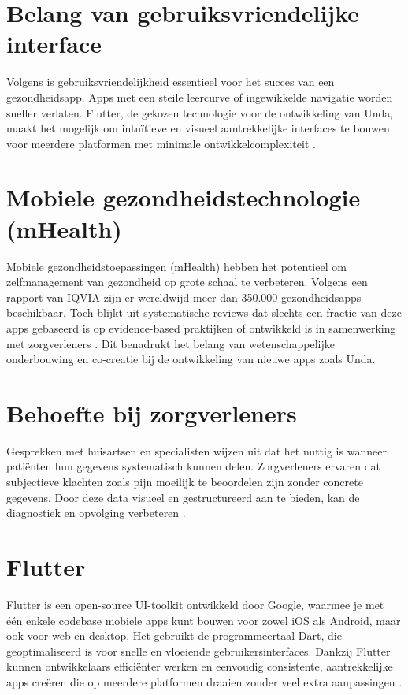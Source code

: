 \section{Belang van gebruiksvriendelijke interface}
Volgens \textcite{Zhao2016} is gebruiksvriendelijkheid essentieel voor het succes van een gezondheidsapp. Apps met een steile leercurve of ingewikkelde navigatie worden sneller verlaten. Flutter, de gekozen technologie voor de ontwikkeling van Unda, maakt het mogelijk om intuïtieve en visueel aantrekkelijke interfaces te bouwen voor meerdere platformen met minimale ontwikkelcomplexiteit \autocite{FlutterDocs2023}.

\section{Mobiele gezondheidstechnologie (mHealth)}
Mobiele gezondheidstoepassingen (mHealth) hebben het potentieel om zelfmanagement van gezondheid op grote schaal te verbeteren. Volgens een rapport van IQVIA zijn er wereldwijd meer dan 350.000 gezondheidsapps beschikbaar. Toch blijkt uit systematische reviews dat slechts een fractie van deze apps gebaseerd is op evidence-based praktijken of ontwikkeld is in samenwerking met zorgverleners \autocite{Byambasuren2018}. Dit benadrukt het belang van wetenschappelijke onderbouwing en co-creatie bij de ontwikkeling van nieuwe apps zoals Unda.

\section{Behoefte bij zorgverleners}
Gesprekken met huisartsen en specialisten wijzen uit dat het nuttig is wanneer patiënten hun gegevens systematisch kunnen delen. Zorgverleners ervaren dat subjectieve klachten zoals pijn moeilijk te beoordelen zijn zonder concrete gegevens. Door deze data visueel en gestructureerd aan te bieden, kan de diagnostiek en opvolging verbeteren \autocite{Ventola2014}.

\section{Flutter}
Flutter is een open-source UI-toolkit ontwikkeld door Google, waarmee je met één enkele codebase mobiele apps kunt bouwen voor zowel iOS als Android, maar ook voor web en desktop. Het gebruikt de programmeertaal Dart, die geoptimaliseerd is voor snelle en vloeiende gebruikersinterfaces. Dankzij Flutter kunnen ontwikkelaars efficiënter werken en eenvoudig consistente, aantrekkelijke apps creëren die op meerdere platformen draaien zonder veel extra aanpassingen \autocite{GoogleFlutter}.

